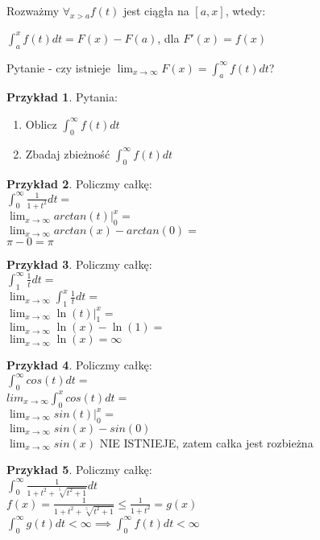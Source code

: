 \documentclass{article}
\theoremstyle{definition}
\theoremstyle{definition}
\theoremstyle{definition}
\newtheorem{pk}{Przykład}[subsection]
\theoremstyle{definition}
\begin{document}
Rozważmy $\forall_{x>a} f(t)$ jest ciągła na $[a,x]$, wtedy:
\begin{center}
    $\int_{a}^{x} f(t) dt = F(x)-F(a)$, dla $F'(x)=f(x)$
\end{center}
Pytanie - czy istnieje $\lim_{x\rightarrow \infty} F(x)=\int_{a}^{\infty} f(t)dt$?

\begin{pk}
    Pytania:
    \begin{enumerate}
        \item Oblicz $\int_{0}^{\infty} f(t) dt$  
        \item Zbadaj zbieżność $\int_{0}^{\infty} f(t) dt$ 
    \end{enumerate}
\end{pk}

\begin{pk}
    Policzmy całkę:\\
    $\int_{0}^{\infty} \frac{1}{1+t^2} dt=$\\
    $\lim_{x\rightarrow\infty} arctan(t) |_0^x=$\\
    $\lim_{x\rightarrow\infty} arctan(x) - arctan(0)=$\\
    $\pi - 0 =\pi$
\end{pk}

\begin{pk}
    Policzmy całkę:\\
    $\int_{1}^{\infty} \frac{1}{t} dt=$\\
    $\lim_{x\rightarrow \infty} \int_{1}^{x} \frac{1}{t} dt=$\\
    $\lim_{x\rightarrow \infty} \ln(t)|_1^x=$\\
    $\lim_{x\rightarrow \infty} \ln(x) - \ln(1)=$\\
    $\lim_{x\rightarrow \infty} \ln(x) = \infty$
\end{pk}

\begin{pk}
    Policzmy całkę:\\
    $\int_{0}^{\infty} cos(t) dt=$\\
    $lim_{x\rightarrow \infty} \int_{0}^{x} cos(t)dt=$\\
    $\lim_{x\rightarrow \infty} sin(t)|_0^x=$\\
    $\lim_{x\rightarrow \infty} sin(x) - sin(0)$\\
    $\lim_{x\rightarrow \infty} sin(x)$ NIE ISTNIEJE, zatem całka jest rozbieżna
\end{pk}

\begin{pk}
    Policzmy całkę:\\
    $\int_{0}^{\infty} \frac{1}{1+t^2+\sqrt[5]{t^2+1}} dt$\\
    $f(x) = \frac{1}{1+t^2+\sqrt[5]{t^2+1}} \leq \frac{1}{1+t^2} = g(x)$\\
    $\int_{0}^{\infty} g(t) dt < \infty \implies \int_{0}^{\infty} f(t) dt < \infty$
\end{pk}
\end{document}
